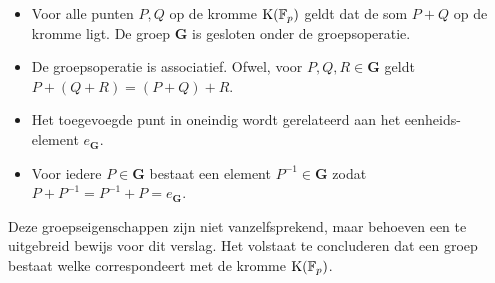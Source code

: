 \documentclass{article}
\begin{document}
\begin{itemize}
\item Voor alle punten $P, Q$ op de kromme $\textup{K}(\mathbb{F}_{p})$ geldt dat de som $P+Q$ op de kromme ligt. De groep $\mathbf{G}$ is gesloten onder de groepsoperatie. \\
\item De groepsoperatie is associatief. Ofwel, voor $P, Q, R \in \mathbf{G}$ geldt \\ $P+(Q+R) = (P+Q)+R$. \\
\item Het toegevoegde punt in oneindig wordt gerelateerd aan het eenheids- \\ element $e_{\mathbf{G}}$. \\
\item Voor iedere $P \in \mathbf{G}$ bestaat een element $P^{-1} \in \mathbf{G}$ zodat \\ $P+P^{-1} = P^{-1}+P = e_{\mathbf{G}}$. \\
\end{itemize}

Deze groepseigenschappen zijn niet vanzelfsprekend, maar behoeven een te uitgebreid bewijs voor dit verslag. Het volstaat te concluderen dat een groep bestaat welke correspondeert met de kromme $\textup{K}(\mathbb{F}_{p})$.
\end{document}
